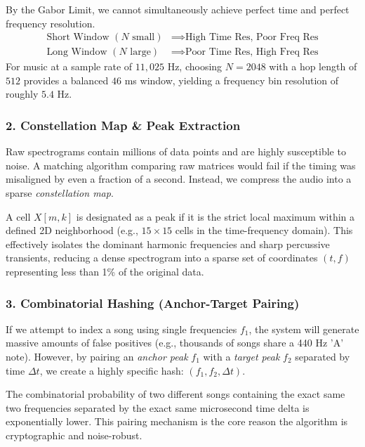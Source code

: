 \documentclass[12pt,a4paper]{article}
\begin{document}
\begin{math_box}
    By the Gabor Limit, we cannot simultaneously achieve perfect time and perfect frequency resolution. 
    \begin{align*}
        \text{Short Window } (N \text{ small}) &\implies \text{High Time Res, Poor Freq Res} \\
        \text{Long Window } (N \text{ large}) &\implies \text{Poor Time Res, High Freq Res}
    \end{align*}
    For music at a sample rate of $11,025$ Hz, choosing $N=2048$ with a hop length of $512$ provides a balanced $46$ ms window, yielding a frequency bin resolution of roughly $5.4$ Hz.
\end{math_box}

\subsubsection{2. Constellation Map \& Peak Extraction}
Raw spectrograms contain millions of data points and are highly susceptible to noise. A matching algorithm comparing raw matrices would fail if the timing was misaligned by even a fraction of a second. Instead, we compress the audio into a sparse \textit{constellation map}.

A cell $X[m,k]$ is designated as a peak if it is the strict local maximum within a defined 2D neighborhood (e.g., $15 \times 15$ cells in the time-frequency domain). This effectively isolates the dominant harmonic frequencies and sharp percussive transients, reducing a dense spectrogram into a sparse set of coordinates $(t, f)$ representing less than 1\% of the original data.

\subsubsection{3. Combinatorial Hashing (Anchor-Target Pairing)}
\begin{insight_box}
If we attempt to index a song using single frequencies $f_1$, the system will generate massive amounts of false positives (e.g., thousands of songs share a 440 Hz 'A' note). However, by pairing an \textit{anchor peak} $f_1$ with a \textit{target peak} $f_2$ separated by time $\Delta t$, we create a highly specific hash: $(f_1, f_2, \Delta t)$. 

The combinatorial probability of two different songs containing the exact same two frequencies separated by the exact same microsecond time delta is exponentially lower. This pairing mechanism is the core reason the algorithm is cryptographic and noise-robust.
\end{insight_box}
\end{document}

